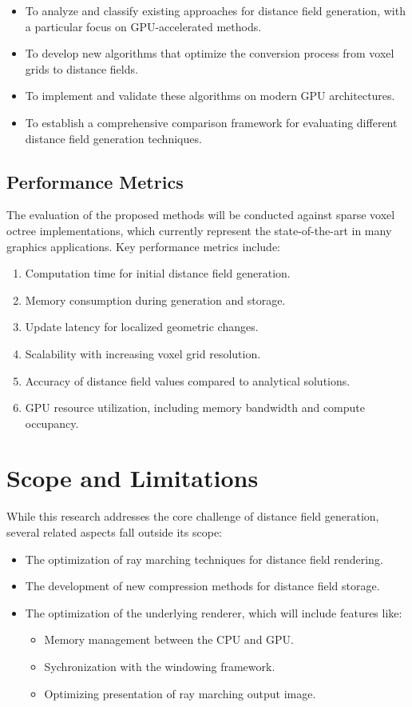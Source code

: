 \begin{itemize}
  \item To analyze and classify existing approaches for distance field generation, with a particular focus on
        GPU-accelerated methods.
  \item To develop new algorithms that optimize the conversion process from voxel grids to distance fields.
  \item To implement and validate these algorithms on modern GPU architectures.
  \item To establish a comprehensive comparison framework for evaluating different distance field generation techniques.
\end{itemize}

\subsection{Performance Metrics}
The evaluation of the proposed methods will be conducted against sparse voxel octree implementations, which currently
represent the state-of-the-art in many graphics applications. Key performance metrics include:

\begin{enumerate}
  \item Computation time for initial distance field generation.
  \item Memory consumption during generation and storage.
  \item Update latency for localized geometric changes.
  \item Scalability with increasing voxel grid resolution.
  \item Accuracy of distance field values compared to analytical solutions.
  \item GPU resource utilization, including memory bandwidth and compute occupancy.
\end{enumerate}

\section{Scope and Limitations}
While this research addresses the core challenge of distance field generation, several related aspects fall outside its
scope:

\begin{itemize}
  \item The optimization of ray marching techniques for distance field rendering.
  \item The development of new compression methods for distance field storage.
  \item The optimization of the underlying renderer, which will include features like:

        \begin{itemize}
          \item Memory management between the CPU and GPU.\@
          \item Sychronization with the windowing framework.
          \item Optimizing presentation of ray marching output image.
        \end{itemize}
\end{itemize}

